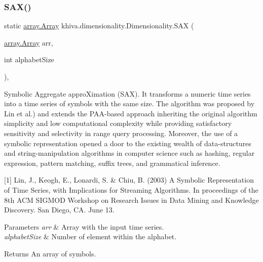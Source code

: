 \mbox{\label{classkhiva_1_1dimensionality_1_1_dimensionality_a668eb21bc1cce2ce731a7e6f6b3b2a0d}} 
\subsubsection{\texorpdfstring{S\+A\+X()}{SAX()}}
{\footnotesize\ttfamily static \mbox{\hyperlink{classkhiva_1_1array_1_1_array}{array.\+Array}} khiva.\+dimensionality.\+Dimensionality.\+S\+AX (\begin{DoxyParamCaption}\item[{\mbox{\hyperlink{classkhiva_1_1array_1_1_array}{array.\+Array}}}]{arr,  }\item[{int}]{alphabet\+Size }\end{DoxyParamCaption})\hspace{0.3cm}{\ttfamily [inline]}, {\ttfamily [static]}}



Symbolic Aggregate appro\+Ximation (S\+AX). It transforms a numeric time series into a time series of symbols with the same size. The algorithm was proposed by Lin et al.) and extends the P\+A\+A-\/based approach inheriting the original algorithm simplicity and low computational complexity while providing satisfactory sensitivity and selectivity in range query processing. Moreover, the use of a symbolic representation opened a door to the existing wealth of data-\/structures and string-\/manipulation algorithms in computer science such as hashing, regular expression, pattern matching, suffix trees, and grammatical inference. 

\mbox{[}1\mbox{]} Lin, J., Keogh, E., Lonardi, S. \& Chiu, B. (2003) A Symbolic Representation of Time Series, with Implications for Streaming Algorithms. In proceedings of the 8th A\+CM S\+I\+G\+M\+OD Workshop on Research Issues in Data Mining and Knowledge Discovery. San Diego, CA. June 13. 


\begin{DoxyParams}{Parameters}
{\em arr} & Array with the input time series.\\
\hline
{\em alphabet\+Size} & Number of element within the alphabet.\\
\hline
\end{DoxyParams}
\begin{DoxyReturn}{Returns}
An array of symbols.
\end{DoxyReturn}


